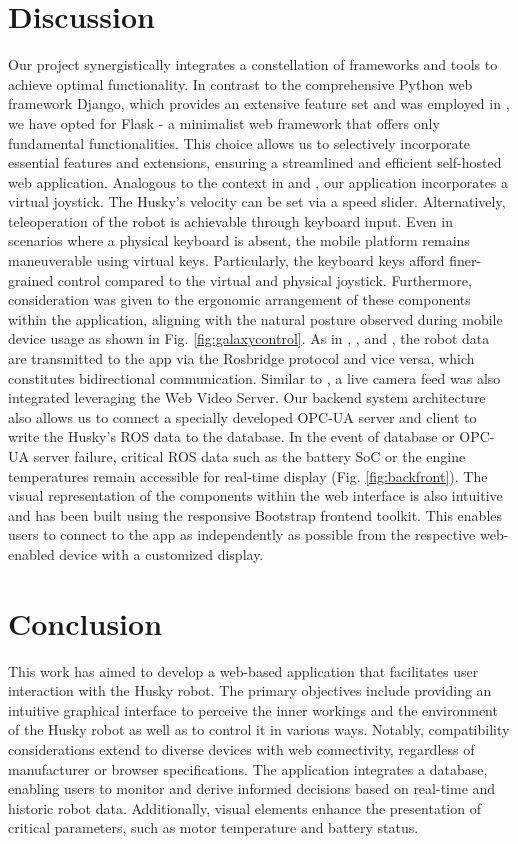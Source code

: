 \documentclass[conference]{IEEEtran}
\begin{document}
\section{Discussion}
Our project synergistically integrates a constellation of frameworks and tools to achieve optimal functionality. In contrast to the comprehensive Python web framework Django, which provides an extensive feature set \cite{django} and was employed in \cite{kapic}, we have opted for Flask - a minimalist web framework that offers only fundamental functionalities. 
This choice allows us to selectively incorporate essential features and extensions, ensuring a streamlined and efficient self-hosted web application. 
Analogous to the context in \cite{kapic} and \cite{dinodi}, our application incorporates a virtual joystick.
The Husky's velocity can be set via a speed slider. Alternatively, teleoperation of the robot is achievable through keyboard input. Even in scenarios where a physical keyboard is absent, the mobile platform remains maneuverable using virtual keys. Particularly, the keyboard keys afford finer-grained control compared to the virtual and physical joystick. 
Furthermore, consideration was given to the ergonomic arrangement of these components within the application, aligning with the natural posture observed during mobile device usage as shown in Fig. \ref{fig:galaxycontrol}.
As in \cite{kapic}, \cite{dinodi}, \cite{johnson} and \cite{wang}, the robot data are transmitted to the app via the Rosbridge protocol and vice versa, which constitutes bidirectional communication. Similar to \cite{johnson}, a live camera feed was also integrated leveraging the Web Video Server.
Our backend system architecture also allows us to connect a specially developed OPC-UA server and client to write the Husky's ROS data to the database. In the event of database or OPC-UA server failure, critical ROS data such as the battery SoC or the engine temperatures remain accessible for real-time display (Fig. \ref{fig:backfront}).
The visual representation of the components within the web interface is also intuitive and has been built using the responsive Bootstrap frontend toolkit. This enables users to connect to the app as independently as possible from the respective web-enabled device with a customized display.

\section{Conclusion}
This work has aimed to develop a web-based application that facilitates user interaction with the Husky robot. The primary objectives include providing an intuitive graphical interface to perceive the inner workings and the environment of the Husky robot as well as to control it in various ways.
Notably, compatibility considerations extend to diverse devices with web connectivity, regardless of manufacturer or browser specifications. The application integrates a database, enabling users to monitor and derive informed decisions based on real-time and historic robot data. 
Additionally, visual elements enhance the presentation of critical parameters, such as motor temperature and battery status.
\end{document}
